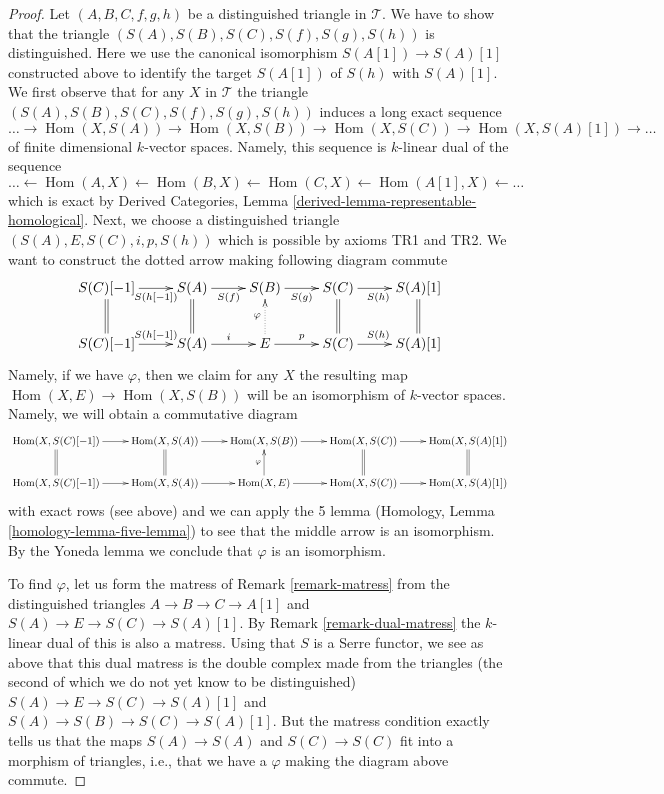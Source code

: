 \documentclass{stacks-project}
\theoremstyle{plain}
\theoremstyle{definition}
\theoremstyle{remark}
\numberwithin{equation}{subsection}
\def\Hom{\mathop{\mathrm{Hom}}\nolimits}
\begin{document}
\begin{proof}
\medskip\noindent
Let $(A, B, C, f, g, h)$ be a distinguished triangle in $\mathcal{T}$.
We have to show that the triangle $(S(A), S(B), S(C), S(f), S(g), S(h))$
is distinguished. Here we use the canonical isomorphism $S(A[1]) \to S(A)[1]$
constructed above to identify the target $S(A[1])$ of $S(h)$ with $S(A)[1]$.
We first observe that for any $X$ in $\mathcal{T}$
the triangle $(S(A), S(B), S(C), S(f), S(g), S(h))$ induces
a long exact sequence
$$
\ldots \to
\Hom(X, S(A)) \to
\Hom(X, S(B)) \to
\Hom(X, S(C)) \to
\Hom(X, S(A)[1]) \to \ldots
$$
of finite dimensional $k$-vector spaces. Namely, this sequence is
$k$-linear dual of the sequence
$$
\ldots \leftarrow
\Hom(A, X) \leftarrow
\Hom(B, X) \leftarrow
\Hom(C, X) \leftarrow
\Hom(A[1], X) \leftarrow
\ldots
$$
which is exact by Derived Categories, Lemma
\ref{derived-lemma-representable-homological}.
Next, we choose a distinguished triangle $(S(A), E, S(C), i, p, S(h))$
which is possible by axioms TR1 and TR2. We want to construct the dotted
arrow making following diagram commute
$$
\xymatrix{
S(C)[-1] \ar[r]_-{S(h[-1])} &
S(A) \ar[r]_{S(f)} &
S(B) \ar[r]_{S(g)} &
S(C) \ar[r]_{S(h)} &
S(A)[1] \\
S(C)[-1] \ar[r]^-{S(h[-1])} \ar@{=}[u] &
S(A) \ar[r]^i \ar@{=}[u] &
E \ar[r]^p \ar@{..>}[u]^\varphi &
S(C) \ar[r]^{S(h)} \ar@{=}[u] &
S(A)[1] \ar@{=}[u]
}
$$
Namely, if we have $\varphi$, then we claim for any $X$ the resulting
map $\Hom(X, E) \to \Hom(X, S(B))$ will be an isomorphism of $k$-vector
spaces. Namely, we will obtain a commutative diagram
$$
\xymatrix{
\Hom(X, S(C)[-1]) \ar[r] &
\Hom(X, S(A)) \ar[r] &
\Hom(X, S(B)) \ar[r] &
\Hom(X, S(C)) \ar[r] &
\Hom(X, S(A)[1]) \\
\Hom(X, S(C)[-1]) \ar[r] \ar@{=}[u] &
\Hom(X, S(A)) \ar[r] \ar@{=}[u] &
\Hom(X, E) \ar[r] \ar[u]^\varphi &
\Hom(X, S(C)) \ar[r] \ar@{=}[u] &
\Hom(X, S(A)[1]) \ar@{=}[u]
}
$$
with exact rows (see above) and we can apply the 5 lemma
(Homology, Lemma \ref{homology-lemma-five-lemma}) to see
that the middle arrow is an isomorphism. By the Yoneda lemma
we conclude that $\varphi$ is an isomorphism.

\medskip\noindent
To find $\varphi$, let us form the matress of Remark \ref{remark-matress}
from the distinguished triangles
$A \to B \to C \to A[1]$ and $S(A) \to E \to S(C) \to S(A)[1]$.
By Remark \ref{remark-dual-matress} the $k$-linear dual 
of this is also a matress. Using that $S$ is a Serre functor, we
see as above that this dual matress is the double complex made from
the triangles (the second of which we do not yet know to be distinguished)
$S(A) \to E \to S(C) \to S(A)[1]$ and $S(A) \to S(B) \to S(C) \to S(A)[1]$.
But the matress condition exactly tells us that the maps
$S(A) \to S(A)$ and $S(C) \to S(C)$ fit into a morphism of triangles,
i.e., that we have a $\varphi$ making the diagram above commute.
\end{proof}
\end{document}
